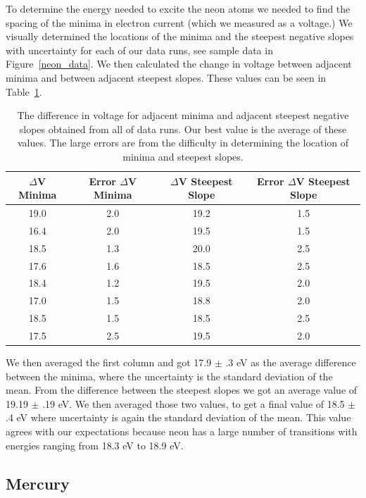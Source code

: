 \documentclass[prb,preprint]{revtex4-1}
\begin{document}
To determine the energy needed to excite the neon atoms we needed to find the spacing of the minima in electron current (which we measured as a voltage.) We visually determined the locations of the minima and the steepest negative slopes with uncertainty for each of our data runs, see sample data in Figure~\ref{neon_data}. We then calculated the change in voltage between adjacent minima and between adjacent steepest slopes. These values can be seen in Table~\ref{neon_dvs}.

\begin{table}[h!]
\centering
\caption{The difference in voltage for adjacent minima and adjacent steepest negative slopes obtained from all of data runs. Our best value is the average of these values. The large errors are from the difficulty in determining the location of minima and steepest slopes.}
\begin{ruledtabular}
\begin{tabular}{c c c c}
$\Delta$V Minima & Error $\Delta$V Minima & $\Delta$V Steepest Slope &  Error $\Delta$V Steepest Slope\\
\hline	%
19.0 & 2.0 & 19.2 & 1.5  \\
16.4 & 2.0 & 19.5 & 1.5  \\
18.5 & 1.3 & 20.0 & 2.5  \\
17.6 & 1.6 & 18.5 & 2.5  \\
18.4 & 1.2 & 19.5 & 2.0  \\
17.0 & 1.5 & 18.8 & 2.0  \\
18.5 & 1.5 & 18.5 & 2.5  \\
17.5 & 2.5 & 19.5 & 2.0  \\

\end{tabular}
\end{ruledtabular}
\label{neon_dvs}
\end{table}

We then averaged the first column and got 17.9 $\pm$ .3 eV as the average difference between the minima, where the uncertainty is the standard deviation of the mean. From the difference between the steepest slopes we got an average value of 19.19 $\pm$ .19 eV. We then averaged those two values, to get a final value of 18.5 $\pm$ .4 eV where uncertainty is again the standard deviation of the mean. This value agrees with our expectations because neon has a large number of transitions with energies ranging from 18.3 eV to 18.9 eV.

\subsection{Mercury}
\end{document}
